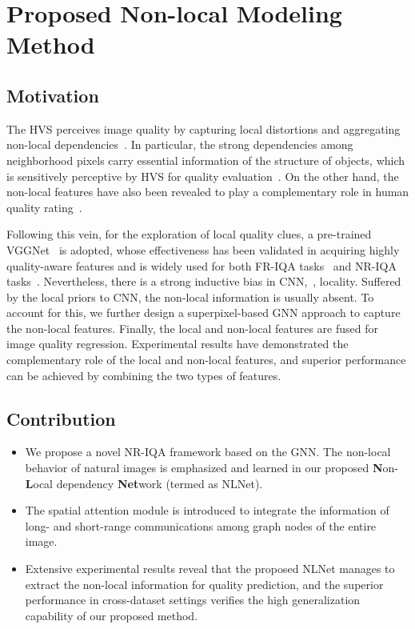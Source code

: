 \chapter{Proposed Non-local Modeling Method}
\graphicspath{{Chapter4/}}
\label{chap:chapter4}

\section{Motivation}
The HVS perceives image quality by capturing local distortions and aggregating non-local dependencies~\citep{golestaneh2021no, liu2020long}. In particular, the strong dependencies among neighborhood pixels carry essential information of the structure of objects, which is sensitively perceptive by HVS for quality evaluation~\citep{wang2004image}. On the other hand, the non-local features have also been revealed to play a complementary role in human quality rating~\citep{zontak2011internal}.

Following this vein, for the exploration of local quality clues, a pre-trained VGGNet~\citep{SimonyanZ14a} is adopted, whose effectiveness has been validated in acquiring highly quality-aware features and is widely used for both FR-IQA tasks~\citep{ding2021comparison} and NR-IQA tasks~\citep{liu2017rankiqa}. Nevertheless, there is a strong inductive bias in CNN,~\ie, locality. Suffered by the local priors to CNN, the non-local information is usually absent. To account for this, we further design a superpixel-based GNN approach to capture the non-local features. Finally, the local and non-local features are fused for image quality regression. Experimental results have demonstrated the complementary role of the local and non-local features, and superior performance can be achieved by combining the two types of features.

\section{Contribution}
\begin{itemize}
	\item We propose a novel NR-IQA framework based on the GNN. The non-local behavior of natural images is emphasized and learned in our proposed \textbf{N}on-\textbf{L}ocal dependency \textbf{Net}work (termed as NLNet).
	\item The spatial attention module is introduced to integrate the information of long- and short-range communications among graph nodes of the entire image.
	\item Extensive experimental results reveal that the proposed NLNet manages to extract the non-local information for quality prediction, and the superior performance in cross-dataset settings verifies the high generalization capability of our proposed method.
\end{itemize}

